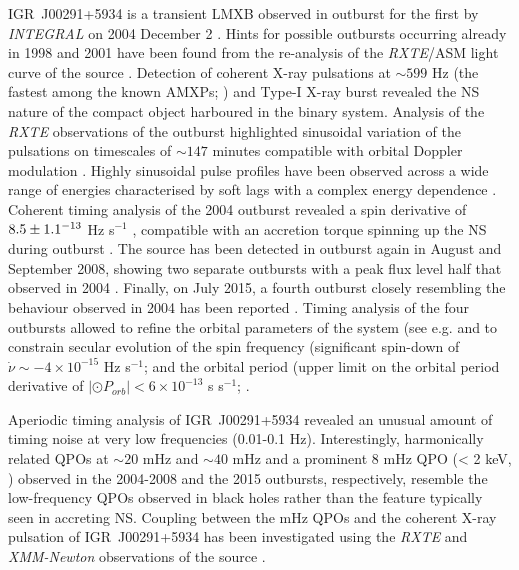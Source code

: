 \documentclass[graybox]{svmult}
\def \inte {{\em INTEGRAL\xspace}}
\def \xmm {{\em XMM-Newton\xspace}}
\def \rxte {{\em RXTE\xspace}}
\begin{document}
IGR~J00291+5934 is a transient LMXB observed in outburst for the first by \inte{} on 2004 December 2 \cite{Shaw2005}. Hints for possible outbursts occurring already in 1998 and 2001 have been found from the re-analysis of the \rxte{}/ASM light curve of the source \cite{Remillard2004}. Detection of coherent X-ray pulsations at $\sim599$ Hz (the fastest among the known AMXPs; \cite{Eckert2004,Markwardt2004a}) and Type-I X-ray burst \cite{Kuin2015} revealed the NS nature of the compact object harboured in the binary system. Analysis of the \rxte{} observations of the outburst highlighted sinusoidal variation of the pulsations on timescales of $\sim147$ minutes compatible with orbital Doppler modulation \cite{Markwardt2004b,Galloway2005}. Highly sinusoidal pulse profiles have been observed across a wide range of energies \cite{Galloway2005,Falanga2005b} characterised by soft lags with a complex energy dependence \cite{Galloway2005,Falanga2007}. Coherent timing analysis of the 2004 outburst revealed a spin derivative of $8.5\pm1.1 \time 10^{-13}$ Hz s$^{-1}$ \cite{Falanga2005b,Burderi2007}, compatible with an accretion torque spinning up the NS during outburst \cite{Burderi2007}.  
The source has been detected in outburst again in August and September 2008, showing two separate outbursts with a peak flux level half that observed in 2004 \cite{Chakrabarty2008, Lewis2008}. Finally, on July 2015, a fourth outburst closely resembling the behaviour observed in 2004 has been reported \cite{Sanna2015,DeFalco2017,Sanna2017d}. Timing analysis of the four outbursts allowed to refine the orbital parameters of the system (see e.g. \cite{Patruno2010,Hartman2011,Papitto2011c,Sanna2017d} and to constrain secular evolution of the spin frequency (significant spin-down  of $\dot{\nu}\sim-4\times10^{-15}$ Hz s$^{-1}$; \cite{Patruno2010, Hartman2011, Papitto2011c} and the orbital period (upper limit on the orbital period derivative of $|\odot{P}_{orb}|< 6\times 10^{-13}$ s s$^{-1}$; \cite{Patruno2017,Sanna2017d}. 

Aperiodic timing analysis of IGR~J00291+5934 revealed an unusual amount of timing noise at very low frequencies (0.01-0.1 Hz). Interestingly, harmonically related QPOs at $\sim20$ mHz and $\sim40$ mHz \cite{Linares2007,Hartman2011} and a prominent 8 mHz QPO (< 2 keV, \cite{Ferrigno2017}) observed in the 2004-2008 and the 2015 outbursts, respectively, resemble the low-frequency QPOs observed in black holes \cite{Linares2007} rather than the feature typically seen in accreting NS. Coupling between the mHz QPOs and the coherent X-ray pulsation of IGR~J00291+5934 has been investigated using the \rxte{} and \xmm{} observations of the source \cite{Bult2017}.
\end{document}
